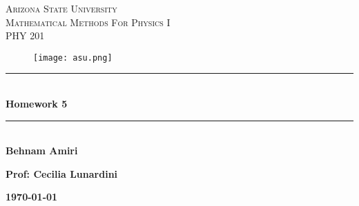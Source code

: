 \documentclass[fleqn]{article}
\begin{document}
\begin{titlepage}

\newcommand{\HRule}{\rule{\linewidth}{0.5mm}} %

\center %
 


\textsc{\LARGE Arizona State University}\\[1.5cm] %

\textsc{\Large Mathematical Methods For Physics I }\\[0.5cm] %
\textsc{\large PHY 201}\\[0.5cm] %



\begin{figure}
  \texttt{[image: asu.png]}
\end{figure}



\HRule \\[0.4cm]
{ \huge \bfseries Homework 5}\\[0.4cm] 
\HRule \\[1.5cm]
 
\textbf{Behnam Amiri}

\bigbreak

\textbf{Prof: Cecilia Lunardini}

\bigbreak


\textbf{{\large \today}\\[2cm]}

\vfill %

\end{titlepage}
\end{document}
